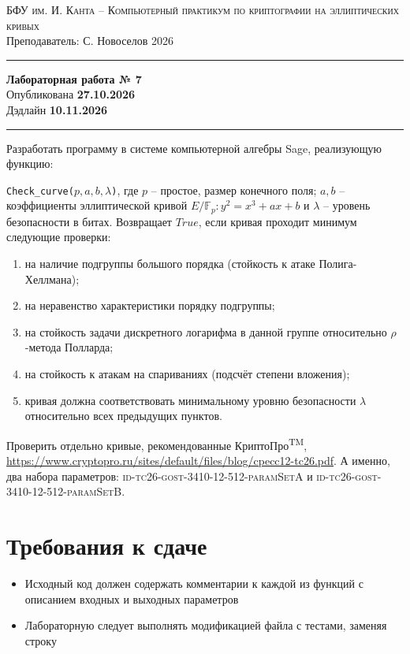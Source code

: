 \documentclass[11pt]{exam}
\theoremstyle{definition}
\begin{document}
	
	{\noindent
		\textsc{БФУ им. И. Канта -- Компьютерный практикум по криптографии на эллиптических кривых }\\[5pt]
		Преподаватель: {С. Новоселов}   \hfill{2026\\}
	\hrule
	\begin{center}
		{\LARGE\textbf{
				Лабораторная работа № 7 \\[5pt]
		}} 
			Опубликована \textbf{27.10.2026} \\[5pt] 
			Дэдлайн \textbf{10.11.2026}
		
	\end{center}
	\hrule \vspace{5mm}
	
	\thispagestyle{empty}
	
	Разработать программу в системе компьютерной алгебры Sage, реализующую функцию:
    
        \texttt{Check\_curve($p, a, b, \lambda$)}, где $p$ -- простое, размер конечного поля; $a, b$ -- коэффициенты эллиптической кривой $E/\mathbb{F}_p: y^2 = x^3 + a x + b$ и  $\lambda$ -- уровень безопасности в битах. Возвращает $True$, если кривая проходит минимум следующие проверки:
        \begin{enumerate}
            \item на наличие подгруппы большого порядка (стойкость к атаке Полига-Хеллмана);
            \item на неравенство характеристики порядку подгруппы;
            \item на стойкость задачи дискретного логарифма в данной группе относительно $\rho$-метода Полларда;
            \item на стойкость к атакам на спариваниях (подсчёт степени вложения);
            \item кривая должна соответствовать минимальному уровню безопасности $\lambda$ относительно всех предыдущих пунктов.
        \end{enumerate}
    
    Проверить отдельно кривые, рекомендованные КриптоПро\textsuperscript{TM}, \url{https://www.cryptopro.ru/sites/default/files/blog/cpecc12-tc26.pdf}. А именно, два набора параметров: \textsc{ id-tc26-gost-3410-12-512-paramSetA} и \textsc{id-tc26-gost-3410-12-512-paramSetB}.
    
    
\normalsize
\section*{Требования к сдаче}
\begin{itemize}
    \item Исходный код должен содержать комментарии к каждой из функций с описанием входных и выходных параметров
    \item Лабораторную следует выполнять модификацией файла с тестами, заменяя строку
    

\end{itemize}}
\end{document}
